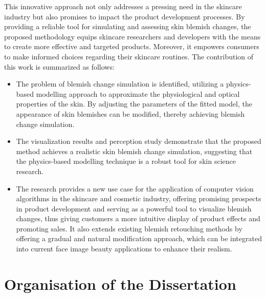 \begin{spacing}{1.5}
This innovative approach not only addresses a pressing need in the skincare industry but also promises to impact the product development processes. By providing a reliable tool for simulating and assessing skin blemish changes, the proposed methodology equips skincare researchers and developers with the means to create more effective and targeted products. Moreover, it empowers consumers to make informed choices regarding their skincare routines. The contribution of this work is summarized as follows:
\begin{itemize}
    \item The problem of blemish change simulation is identified, utilizing a physics-based modelling approach to approximate the physiological and optical properties of the skin. By adjusting the parameters of the fitted model, the appearance of skin blemishes can be modified, thereby achieving blemish change simulation.
    \item The visualization results and perception study demonstrate that the proposed method achieves a realistic skin blemish change simulation, suggesting that the physics-based modelling technique is a robust tool for skin science research.
    \item The research provides a new use case for the application of computer vision algorithms in the skincare and cosmetic industry, offering promising prospects in product development and serving as a powerful tool to visualize blemish changes, thus giving customers a more intuitive display of product effects and promoting sales. It also extends existing blemish retouching methods by offering a gradual and natural modification approach, which can be integrated into current face image beauty applications to enhance their realism.
\end{itemize}

\section{Organisation of the Dissertation}


\end{spacing}
